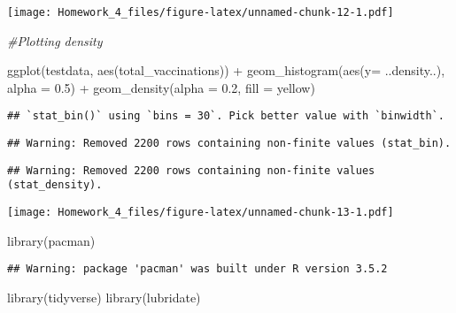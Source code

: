 \documentclass[
]{article}
\newenvironment{Shaded}{\begin{snugshade}}{\end{snugshade}}
\newcommand{\AttributeTok}[1]{\textcolor[rgb]{0.77,0.63,0.00}{#1}}
\newcommand{\CommentTok}[1]{\textcolor[rgb]{0.56,0.35,0.01}{\textit{#1}}}
\newcommand{\FloatTok}[1]{\textcolor[rgb]{0.00,0.00,0.81}{#1}}
\newcommand{\FunctionTok}[1]{\textcolor[rgb]{0.00,0.00,0.00}{#1}}
\newcommand{\NormalTok}[1]{#1}
\newcommand{\SpecialCharTok}[1]{\textcolor[rgb]{0.00,0.00,0.00}{#1}}
\newcommand{\StringTok}[1]{\textcolor[rgb]{0.31,0.60,0.02}{#1}}
\begin{document}
\texttt{[image: Homework\_4\_files/figure-latex/unnamed-chunk-12-1.pdf]}

\begin{Shaded}
\begin{Highlighting}[]
\CommentTok{\#Plotting density }

\FunctionTok{ggplot}\NormalTok{(testdata, }\FunctionTok{aes}\NormalTok{(total\_vaccinations)) }\SpecialCharTok{+} \FunctionTok{geom\_histogram}\NormalTok{(}\FunctionTok{aes}\NormalTok{(}\AttributeTok{y=}\NormalTok{ ..density..), }\AttributeTok{alpha =} \FloatTok{0.5}\NormalTok{) }\SpecialCharTok{+} \FunctionTok{geom\_density}\NormalTok{(}\AttributeTok{alpha =} \FloatTok{0.2}\NormalTok{, }\AttributeTok{fill =} \StringTok{\textquotesingle{}yellow\textquotesingle{}}\NormalTok{)}
\end{Highlighting}
\end{Shaded}

\begin{verbatim}
## `stat_bin()` using `bins = 30`. Pick better value with `binwidth`.
\end{verbatim}

\begin{verbatim}
## Warning: Removed 2200 rows containing non-finite values (stat_bin).
\end{verbatim}

\begin{verbatim}
## Warning: Removed 2200 rows containing non-finite values (stat_density).
\end{verbatim}

\texttt{[image: Homework\_4\_files/figure-latex/unnamed-chunk-13-1.pdf]}

\begin{Shaded}
\begin{Highlighting}[]
\FunctionTok{library}\NormalTok{(pacman)}
\end{Highlighting}
\end{Shaded}

\begin{verbatim}
## Warning: package 'pacman' was built under R version 3.5.2
\end{verbatim}

\begin{Shaded}
\begin{Highlighting}[]
\FunctionTok{library}\NormalTok{(tidyverse)}
\FunctionTok{library}\NormalTok{(lubridate)}
\end{Highlighting}
\end{Shaded}
\end{document}

